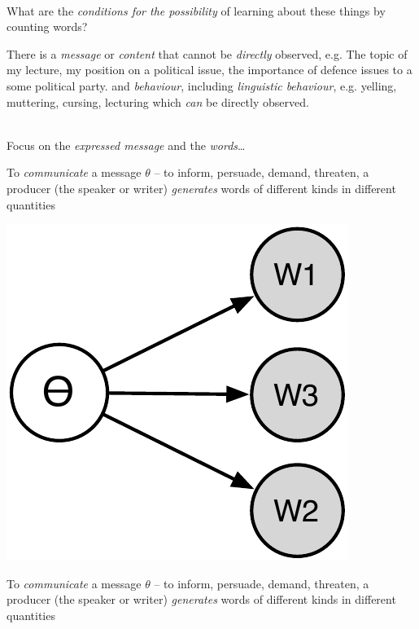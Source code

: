 \documentclass{mediumfoils}
\begin{document}
~\\
What are the \textit{conditions for the possibility} of learning about these things by counting words?


There is a \textsl{message} or \textit{content} that cannot be \textit{directly} observed, e.g. 
\ita 
\itm The topic of my lecture, my position on a political issue, the importance of defence issues to a some political party.
\itz
 and \textit{behaviour}, including \textsl{linguistic behaviour}, e.g. 
\ita
\itm yelling, muttering, cursing, lecturing 
\itz
which \textit{can} be directly observed.

~\\
Focus on the \textit{expressed message} and the \textit{words}\ldots


To \textsl{communicate} a message $\theta$ -- to inform, persuade, demand, threaten, a producer (the speaker or writer) \textsl{generates} words of different kinds in different quantities


\begin{center}
\includegraphics[scale=.9]{pictures/gen}
\end{center}


To \textsl{communicate} a message $\theta$ -- to inform, persuade, demand, threaten, a producer (the speaker or writer) \textsl{generates} words of different kinds in different quantities
\end{document}
